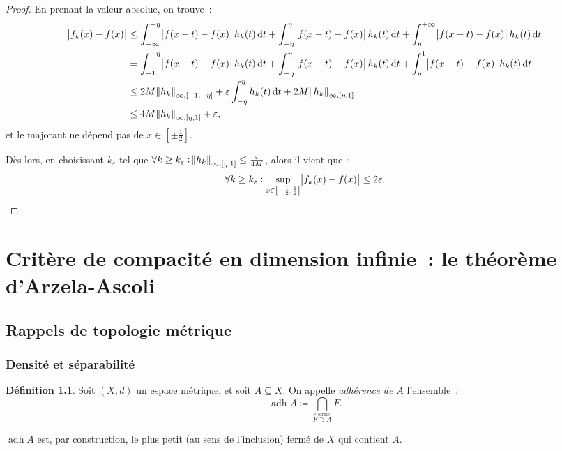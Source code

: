 \documentclass{report}
\theoremstyle{definition}
\newtheorem{déf}[thm]{Définition}
\theoremstyle{remark}
\numberwithin{equation}{section}
\DeclareMathOperator{\adh}{adh}
\newcommand{\minfty}{{-\infty}}
\newcommand{\pinfty}{{+\infty}}
\begin{document}
\begin{proof}
			En prenant la valeur absolue, on trouve~:
			\begin{align}
				\abs {f_k(x)-f(x)}
					&\leq \int_\minfty^{-\eta}\abs {f(x-t)-f(x)}h_k(t)\dif t + \int_{-\eta}^{\eta}\abs {f(x-t)-f(x)}h_k(t)\dif t + \int_\eta^\pinfty\abs {f(x-t)-f(x)}h_k(t)\dif t \\
				&= \int_{-1}^{-\eta}\abs {f(x-t)-f(x)}h_k(t)\dif t + \int_{-\eta}^{\eta}\abs {f(x-t)-f(x)}h_k(t)\dif t + \int_\eta^1\abs {f(x-t)-f(x)}h_k(t)\dif t \\
				&\leq 2M\norm {h_k}_{\infty, [-1, -\eta]} + \varepsilon\int_{-\eta}^\eta h_k(t)\dif t + 2M\norm {h_k}_{\infty, [\eta, 1]} \\
				&\leq 4M\norm {h_k}_{\infty, [\eta, 1]} + \varepsilon,
			\end{align}
			et le majorant ne dépend pas de $x \in \left[\pm\frac 12\right]$.

			Dès lors, en choisissant $k_\varepsilon$ tel que $\forall k \geq k_\varepsilon : \norm {h_k}_{\infty, [\eta, 1]} \leq \frac \varepsilon{4M}$, alors il vient que~:
			\begin{equation}
				\forall k \geq k_\varepsilon : \sup_{x \in \left[-\frac 12, \frac 12\right]}\abs {f_k(x)-f(x)} \leq 2\varepsilon.
			\end{equation}
			\end{proof}		


\chapter{Critère de compacité en dimension infinie~: le théorème d'Arzela-Ascoli}
	\section{Rappels de topologie métrique}
		\subsection{Densité et séparabilité}
			\begin{déf} Soit $(X, d)$ un espace métrique, et soit $A \subseteq X$. On appelle \textit{adhérence de $A$} l'ensemble~:
			\begin{equation}
				\adh A \coloneqq \bigcap_{\overset {F \text{ fermé }}{F \supset A}} F.
			\end{equation}

			$\adh A$ est, par construction, le plus petit (au sens de l'inclusion) fermé de $X$ qui contient $A$.
			\end{déf}
\end{document}
